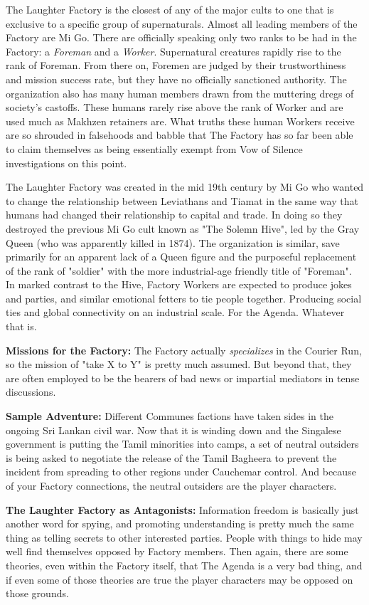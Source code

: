The Laughter Factory is the closest of any of the major cults to one that is exclusive to a specific group of supernaturals. Almost all leading members of the Factory are Mi Go. There are officially speaking only two ranks to be had in the Factory: a \textit{Foreman} and a \textit{Worker}. Supernatural creatures rapidly rise to the rank of Foreman. From there on, Foremen are judged by their trustworthiness and mission success rate, but they have no officially sanctioned authority. The organization also has many human members drawn from the muttering dregs of society's castoffs. These humans rarely rise above the rank of Worker and are used much as Makhzen retainers are. What truths these human Workers receive are so shrouded in falsehoods and babble that The Factory has so far been able to claim themselves as being essentially exempt from Vow of Silence investigations on this point.

The Laughter Factory was created in the mid 19th century by Mi Go who wanted to change the relationship between Leviathans and Tiamat in the same way that humans had changed their relationship to capital and trade. In doing so they destroyed the previous Mi Go cult known as "The Solemn Hive", led by the Gray Queen (who was apparently killed in 1874). The organization is similar, save primarily for an apparent lack of a Queen figure and the purposeful replacement of the rank of "soldier" with the more industrial-age friendly title of "Foreman". In marked contrast to the Hive, Factory Workers are expected to produce jokes and parties, and similar emotional fetters to tie people together. Producing social ties and global connectivity on an industrial scale. For the Agenda. Whatever that is.

\textbf{Missions for the Factory:} The Factory actually \textit{specializes} in the Courier Run, so the mission of "take X to Y" is pretty much assumed. But beyond that, they are often employed to be the bearers of bad news or impartial mediators in tense discussions.

\textbf{Sample Adventure:} Different Communes factions have taken sides in the ongoing Sri Lankan civil war. Now that it is winding down and the Singalese government is putting the Tamil minorities into camps, a set of neutral outsiders is being asked to negotiate the release of the Tamil Bagheera to prevent the incident from spreading to other regions under Cauchemar control. And because of your Factory connections, the neutral outsiders are the player characters.

\textbf{The Laughter Factory as Antagonists:} Information freedom is basically just another word for spying, and promoting understanding is pretty much the same thing as telling secrets to other interested parties. People with things to hide may well find themselves opposed by Factory members. Then again, there are some theories, even within the Factory itself, that The Agenda is a very bad thing, and if even some of those theories are true the player characters may be opposed on those grounds.


